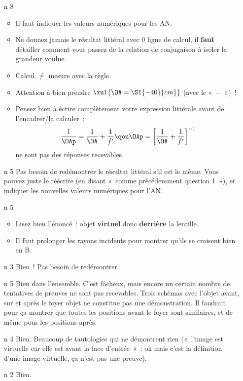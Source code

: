 \documentclass[a4paper, 11pt, final, garamond]{book}
\begin{document}
\begin{enumerate}[label=\sqenumi]
	\item[n]{8}%
	      \vspace{-22pt}
	      \begin{itemize}
		      \item Il faut indiquer les valeurs numériques pour les AN.
		      \item Ne donnez jamais le résultat littéral avec 0 ligne de calcul, il
		            \textbf{faut} détailler comment vous passez de la relation de
		            conjugaison à isoler la grandeur voulue.
		      \item Calcul $\neq$ mesure avec la règle.
		      \item Attention à bien prendre $\xul{\OA = \SI{-40}{cm}}$ (avec le
		            «~$-$~»)~!
		      \item Pensez bien à écrire complètement votre expression littérale avant
		            de l'encadrer/la calculer~:
		            \[
			            \frac{1}{\OAp} = \frac{1}{\OA} + \frac{1}{f'}
			            \qou
			            \OAp = \left[\frac{1}{\OA} + \frac{1}{f'}\right]^{-1}
		            \]
		            ne sont pas des réponses recevables.
	      \end{itemize}
	\item[n]{5}%
	      Pas besoin de redémontrer le résultat littéral s'il est le même. Vous pouvez
	      juste le réécrire (en disant «~comme précédemment question 1~»), et indiquer
	      les nouvelles valeurs numériques pour l'AN.
	\item[n]{5}%
	      \begin{itemize}
		      \item Lisez bien l'énoncé~: objet \textbf{virtuel} donc \textbf{derrière}
		            la lentille.

		      \item Il faut prolonger les rayons incidents pour montrer qu'ils se
		            croisent bien en B.
	      \end{itemize}
	\item[n]{3}%
	      Bien~! Pas besoin de redémontrer.
	\item[n]{5}%
	      Bien dans l'ensemble. C'est fâcheux, mais encore un certain nombre de
	      tentatives de preuves ne sont pas recevables. Trois schémas avec l'objet
	      avant, sur et après le foyer objet ne constitue pas une démonstration.
	      Il faudrait pour ça montrer que toutes les positions avant le foyer sont
	      similaires, et de même pour les positions après.
	\item[n]{4}%
	      Bien. Beaucoup de tautologies qui ne démontrent rien («~l'image est
	      virtuelle car elle est avant la face d'entrée~»~: ok mais c'est la
	      définition d'une image virtuelle, ça n'est pas une preuve).
	\item[n]{2}%
	      Bien.
\end{enumerate}
\end{document}

